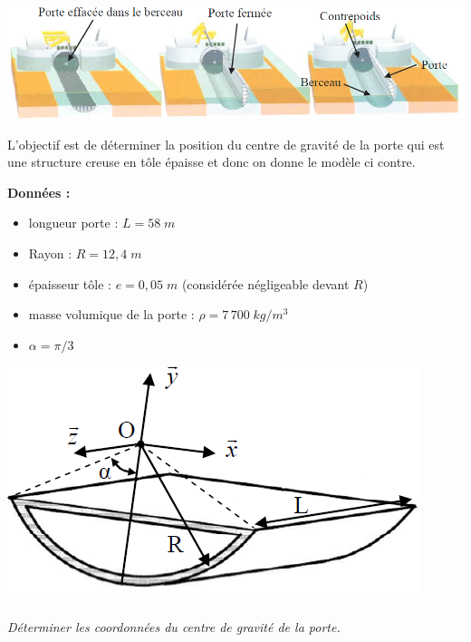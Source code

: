 \documentclass[10pt]{article}
\begin{document}
{\begin{center}
\includegraphics[width=.9\textwidth]{images/fig2}
\end{center}


\begin{minipage}[c]{.55\linewidth}

L'objectif est de déterminer la position du centre de gravité de la porte qui est une structure creuse en tôle épaisse et donc on donne le modèle ci contre.

\textbf{Données :}
\begin{itemize}
\item longueur porte : $L=58\;m$
\item Rayon : $R=12,4\;m$
\item épaisseur tôle : $e=0,05\;m$ (considérée négligeable devant $R$)
\item masse volumique de la porte : $\rho=7\,700 \; kg/m^3$
\item $\alpha=\pi/3$
\end{itemize}
\end{minipage}\hfill
\begin{minipage}[c]{.4\linewidth}
\begin{center}
\includegraphics[width=.9\textwidth]{images/fig3}
\end{center}
\end{minipage}
}

\subparagraph{}
\textit{Déterminer les coordonnées du centre de gravité de la porte.}
\end{document}

